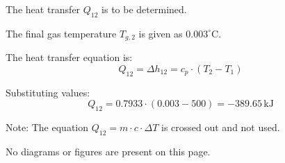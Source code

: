 The heat transfer \( Q_{12} \) is to be determined.  

The final gas temperature \( T_{g,2} \) is given as \( 0.003^\circ \text{C} \).  

The heat transfer equation is:  
\[
Q_{12} = \Delta h_{12} = c_p \cdot (T_2 - T_1)
\]  

Substituting values:  
\[
Q_{12} = 0.7933 \cdot (0.003 - 500) = -389.65 \, \text{kJ}
\]  

Note: The equation \( Q_{12} = m \cdot c \cdot \Delta T \) is crossed out and not used.  

No diagrams or figures are present on this page.